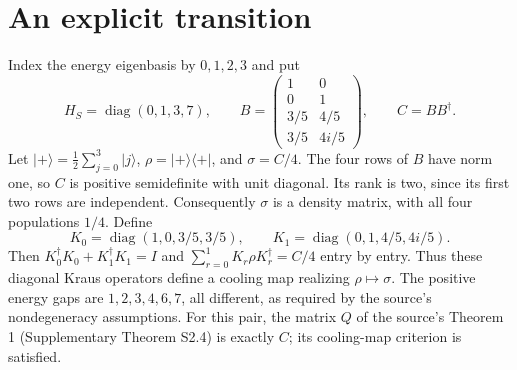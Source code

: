 \documentclass[11pt]{article}
\newcommand{\diag}{\operatorname{diag}}
\newcommand{\ket}[1]{\lvert #1\rangle}
\newcommand{\bra}[1]{\langle #1\rvert}
\begin{document}
\section{An explicit transition}
Index the energy eigenbasis by $0,1,2,3$ and put
\begin{equation}\label{eq:data}
H_S=\diag(0,1,3,7),\qquad
B=\begin{pmatrix}1&0\\0&1\\3/5&4/5\\3/5&4i/5\end{pmatrix},
\qquad C=BB^\dagger.
\end{equation}
Let $\ket+=\frac12\sum_{j=0}^3\ket j$, $\rho=\ket+\bra+$, and $\sigma=C/4$.
The four rows of $B$ have norm one, so $C$ is positive semidefinite with
unit diagonal. Its rank is two, since its first two rows are independent.
Consequently $\sigma$ is a density matrix, with all four populations $1/4$.
Define
\begin{equation}\label{eq:kraus}
K_0=\diag(1,0,3/5,3/5),\qquad
K_1=\diag(0,1,4/5,4i/5).
\end{equation}
Then $K_0^\dagger K_0+K_1^\dagger K_1=I$ and
$\sum_{r=0}^1K_r\rho K_r^\dagger=C/4$ entry by entry. Thus these diagonal
Kraus operators define a cooling map realizing $\rho\mapsto\sigma$.
The positive energy gaps are $1,2,3,4,6,7$, all different, as required by
the source's nondegeneracy assumptions.
For this pair, the matrix $Q$ of the source's Theorem 1 (Supplementary
Theorem S2.4) is exactly $C$; its cooling-map criterion is satisfied.
\end{document}
